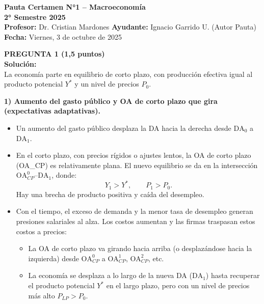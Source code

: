 \documentclass[11pt,addpoints]{article}
\begin{document}
\vspace*{0.1cm}

\begin{center}
{\Large \bfseries Pauta Certamen N°1 – Macroeconomía \\[0.25cm]}
\textbf{2° Semestre 2025}\\[0.3cm]
\textbf{Profesor:} Dr. Cristian Mardones \textbf{Ayudante:} Ignacio Garrido U. (Autor Pauta)\\[0.2cm]
\textbf{Fecha:} Viernes, 3 de octubre de 2025
\end{center}

\vspace{0.4cm}

\textbf{PREGUNTA 1 (1,5 puntos)}\\
\textbf{Solución:}\\
La economía parte en equilibrio de corto plazo, con producción efectiva igual al producto potencial $Y^*$ y un nivel de precios $P_0$.

\medskip
\textbf{1) Aumento del gasto público y OA de corto plazo que gira (expectativas adaptativas).}

\begin{itemize}
  \item Un aumento del gasto público desplaza la DA hacia la derecha desde $\text{DA}_0$ a $\text{DA}_1$.
  \item En el corto plazo, con precios rígidos o ajustes lentos, la OA de corto plazo (OA\_CP) es relativamente plana. El nuevo equilibrio se da en la intersección $\text{OA}_{CP}^0$–$\text{DA}_1$, donde:
  \[
    Y_1 > Y^*, \qquad P_1 > P_0.
  \]
  Hay una brecha de producto positiva y caída del desempleo.

  \item Con el tiempo, el exceso de demanda y la menor tasa de desempleo generan presiones salariales al alza. Los costos aumentan y las firmas traspasan estos costos a precios:
  \begin{itemize}
    \item La OA de corto plazo va girando hacia arriba (o desplazándose hacia la izquierda) desde $\text{OA}_{CP}^0$ a $\text{OA}_{CP}^1$, $\text{OA}_{CP}^2$, etc.
    \item La economía se desplaza a lo largo de la nueva DA ($\text{DA}_1$) hasta recuperar el producto potencial $Y^*$ en el largo plazo, pero con un nivel de precios más alto $P_{LP} > P_0$.
  \end{itemize}
\end{itemize}
\end{document}
